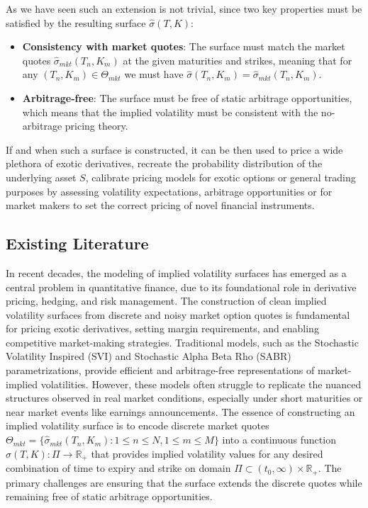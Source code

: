 As we have seen such an extension is not trivial, since two key properties must be satisfied by the resulting surface $\hat{\sigma}(T,K)$:

\begin{itemize}
    \item \textbf{Consistency with market quotes}: The surface must match the market quotes $\hat{\sigma}_{mkt}(T_n, K_m)$ at the given maturities and strikes, meaning that for any $(T_n, K_m) \in \Theta_{mkt}$ we must have $\hat{\sigma}(T_n, K_m) = \hat{\sigma}_{mkt}(T_n, K_m)$.
    \item \textbf{Arbitrage-free}: The surface must be free of static arbitrage opportunities, which means that the implied volatility must be consistent with the no-arbitrage pricing theory.
\end{itemize}

If and when such a surface is constructed, it can be then used to price a wide plethora of exotic derivatives, recreate the probability distribution of the underlying asset $S$, calibrate pricing models for exotic options or general trading purposes by assessing volatility expectations, arbitrage opportunities or for market makers to set the correct pricing of novel financial instruments.

\subsection{Existing Literature}

In recent decades, the modeling of implied volatility surfaces has emerged as a central problem in quantitative finance, due to its foundational role in derivative pricing, hedging, and risk management.
The construction of clean implied volatility surfaces from discrete and noisy market option quotes is fundamental for pricing exotic derivatives, setting margin requirements, and enabling competitive market-making strategies.
Traditional models, such as the Stochastic Volatility Inspired (SVI) and Stochastic Alpha Beta Rho (SABR) parametrizations, provide efficient and arbitrage-free representations of market-implied volatilities.
However, these models often struggle to replicate the nuanced structures observed in real market conditions, especially under short maturities or near market events like earnings announcements.
The essence of constructing an implied volatility surface is to encode discrete market quotes $\Theta_{mkt} = \{\hat{\sigma}_{mkt}(T_n, K_m) : 1 \leq n \leq N, 1 \leq m \leq M\}$ into a continuous function $\hat{\sigma}(T,K): \Pi \rightarrow \mathbb{R}_+$ that provides implied volatility values for any desired combination of time to expiry and strike on domain $\Pi \subset (t_0, \infty) \times \mathbb{R}_+$.
The primary challenges are ensuring that the surface extends the discrete quotes while remaining free of static arbitrage opportunities.

